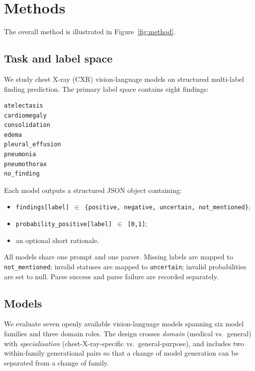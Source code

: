 \section{Methods}

The overall method is illustrated in Figure~\ref{fig:method}.

\subsection{Task and label space}

We study chest X-ray (CXR) vision-language models on structured multi-label finding prediction. The primary label space contains eight findings:

\begin{verbatim}
atelectasis
cardiomegaly
consolidation
edema
pleural_effusion
pneumonia
pneumothorax
no_finding
\end{verbatim}

Each model outputs a structured JSON object containing:

\begin{itemize}
\item \texttt{findings[label] $\in$ \{positive, negative, uncertain, not\_mentioned\}};
\item \texttt{probability\_positive[label] $\in$ [0,1]};
\item an optional short rationale.
\end{itemize}

All models share one prompt and one parser. Missing labels are mapped to \texttt{not\_mentioned}; invalid statuses are mapped to \texttt{uncertain}; invalid probabilities are set to null. Parse success and parse failure are recorded separately.

\subsection{Models}

We evaluate seven openly available vision-language models spanning six model
families and three domain roles. The design crosses \emph{domain}
(medical vs.\ general) with \emph{specialisation} (chest-X-ray-specific vs.\
general-purpose), and includes two within-family generational pairs so that a
change of model generation can be separated from a change of family.

